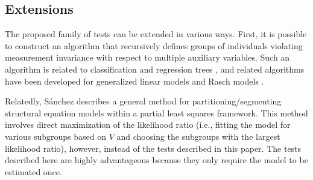\documentclass[man]{apa}
\begin{document}
\subsection{Extensions}
The proposed family of tests can be extended in various ways.  First,
it is possible to construct an algorithm that recursively defines
groups of individuals violating measurement invariance with respect to
multiple auxiliary variables.  Such an algorithm is related to 
classification and regression trees \cite{BreFri84,MerSha10,StrMal09},
and related algorithms have been developed for generalized linear
models \cite{ZeiHot08} and Rasch models \cite{KopZei10}.  

Relatedly,
S\'{a}nchez \citeyear{San09} describes a general
method for partitioning/segmenting structural equation models within a 
partial least squares framework.  This method involves direct maximization of
the likelihood ratio (i.e., fitting the model for various subgroups based on
$V$ and choosing the subgroups with the largest likelihood ratio),
however, instead of the tests described in this paper.  The tests
described here are highly advantageous because they only require the
model to be estimated once.

\end{document}

